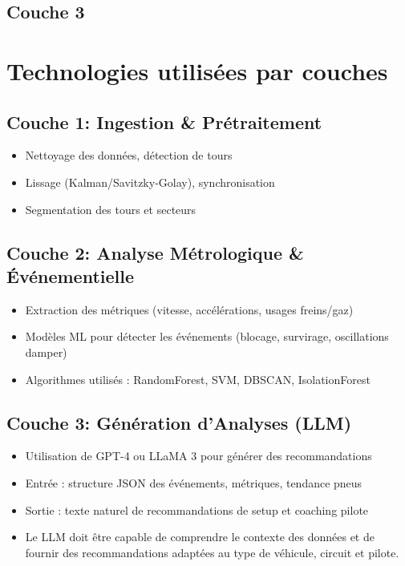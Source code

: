 \documentclass[a4paper,12pt]{report}
\begin{document}
\subsection{Couche 3}

\section{Technologies utilisées par couches}

\subsection{Couche 1: Ingestion \& Prétraitement}

\begin{itemize}
    \item Nettoyage des données, détection de tours
    \item Lissage (Kalman/Savitzky-Golay), synchronisation
    \item Segmentation des tours et secteurs
\end{itemize}

\subsection{Couche 2: Analyse Métrologique \& Événementielle}

\begin{itemize}
    \item Extraction des métriques (vitesse, accélérations, usages freins/gaz)
    \item Modèles ML pour détecter les événements (blocage, survirage, oscillations damper)
    \item Algorithmes utilisés : RandomForest, SVM, DBSCAN, IsolationForest
\end{itemize}

\subsection{Couche 3: Génération d'Analyses (LLM)}

\begin{itemize}
    \item Utilisation de GPT-4 ou LLaMA 3 pour générer des recommandations
    \item Entrée : structure JSON des événements, métriques, tendance pneus
    \item Sortie : texte naturel de recommandations de setup et coaching pilote
    \item Le LLM doit être capable de comprendre le contexte des données et de fournir des recommandations adaptées au type de véhicule, circuit et pilote.
\end{itemize}
\end{document}
